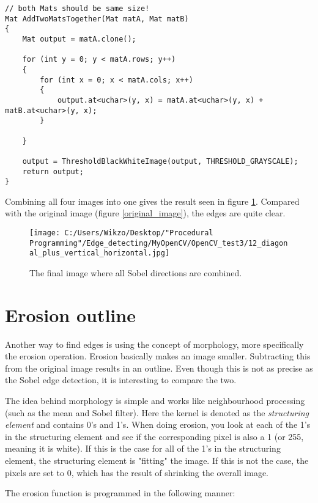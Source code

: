 \begin{lstlisting}
// both Mats should be same size!
Mat AddTwoMatsTogether(Mat matA, Mat matB)
{
	Mat output = matA.clone();

	for (int y = 0; y < matA.rows; y++)
	{
		for (int x = 0; x < matA.cols; x++)
		{
			output.at<uchar>(y, x) = matA.at<uchar>(y, x) + matB.at<uchar>(y, x);
		}

	}

	output = ThresholdBlackWhiteImage(output, THRESHOLD_GRAYSCALE);
	return output;
}
\end{lstlisting}

Combining all four images into one gives the result seen in figure \ref{final_image}. Compared with the original image (figure \ref{original_image}), the edges are quite clear.

\begin{figure} [htbp]
\texttt{[image: C:/Users/Wikzo/Desktop/"Procedural Programming"/Edge\_detecting/MyOpenCV/OpenCV\_test3/12\_diagonal\_plus\_vertical\_horizontal.jpg]}
\centering
\caption{The final image where all Sobel directions are combined.}
\label{final_image}
\end{figure}

\section{Erosion outline}
Another way to find edges is using the concept of morphology, more specifically the erosion operation. Erosion basically makes an image smaller. Subtracting this from the original image results in an outline. Even though this is not as precise as the Sobel edge detection, it is interesting to compare the two.

The idea behind morphology is simple and works like neighbourhood processing (such as the mean and Sobel filter). Here the kernel is denoted as the \textit{structuring element} and contains 0's and 1's. When doing erosion, you look at each of the 1's in the structuring element and see if the corresponding pixel is also a 1 (or 255, meaning it is white). If this is the case for all of the 1's in the structuring element, the structuring element is "fitting" the image. If this is not the case, the pixels are set to 0, which has the result of shrinking the overall image. \citep{ip_book}

The erosion function is programmed in the following manner:

